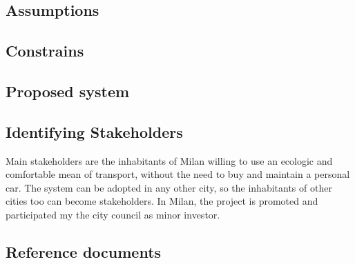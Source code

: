 \documentclass{article}
\begin{document}
		\subsection{Assumptions}
		

		\subsection{Constrains}

		\subsection{Proposed system}

		\subsection{Identifying Stakeholders}
			Main stakeholders are the inhabitants of Milan willing to use an ecologic and comfortable mean of transport, without the need to buy and maintain a personal car.
			The system can be adopted in any other city, so the inhabitants of other cities too can become stakeholders.
			In Milan, the project is promoted and participated my the city council as minor investor.

		\subsection{Reference documents}

	\newpage
\end{document}
